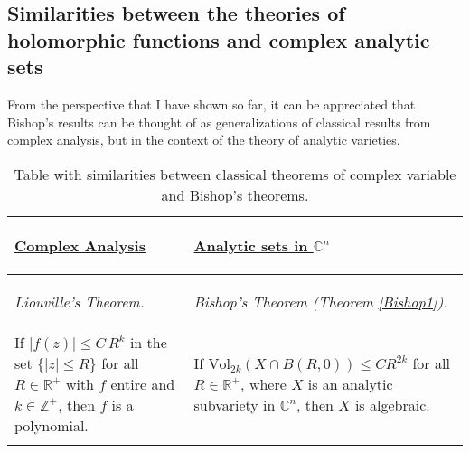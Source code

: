 \documentclass[12pt,twoside,a4paper]{report}
\newcommand{\zah}{\ensuremath{ \mathbb Z }}
\newcommand{\con}{\ensuremath{\mathbb{C}^n}}
\newcommand{\re}{\ensuremath{\mathbb R }}
\begin{document}
\subsection{Similarities between the theories of holomorphic functions and complex analytic sets}

\noindent From the perspective that I have shown so far, it can be appreciated that Bishop's results can be thought of as generalizations of classical results from complex analysis, but in the context of the theory of analytic varieties.

\begin{table}[hpt]
        \caption{Table with similarities between classical theorems of complex variable and Bishop's theorems.}\label{Tab}
        \centering
        \begin{tabular}{|m{5.5cm}|m{5.5cm}|} \hline
                        \begin{center} \vspace*{0.2cm}
                                \underline{\textbf{Complex Analysis}}
                        \end{center} &
                        \begin{center} \vspace*{0.2cm}
                                \underline{\textbf{Analytic sets in $\con$}}
                        \end{center} \\
                \hline
                \begin{center}
                        \textit{Liouville's Theorem.}
                \end{center} &
                \begin{center}
                        \textit{Bishop's Theorem (Theorem \ref{Bishop1}).}
                \end{center}\\
                        \hline If $\vert f(z)\vert\leq C\,R^k$ in the set $\{\vert z\vert\leq R\}$
                        for all $R\in\re^{+}$ with $f$ entire and $k\in\zah^{+}$, then
                        $f$ is a polynomial.
                        &
                        \vspace{0.1cm}
                        If $\textrm{Vol}_{2k}(X\cap B(R,0))\leq CR^{2k}$ for all
                        $R\in\re^{+}$, where $X$ is an analytic subvariety in $\con$, then $X$ is algebraic.\\
                        \hline
                        \vspace{0.1cm}

\end{tabular}
\end{table}
\end{document}
